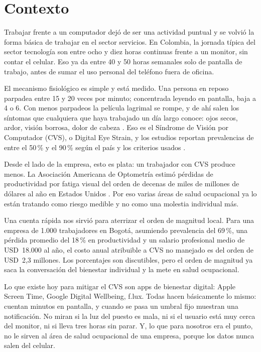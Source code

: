 \documentclass[conference]{IEEEtran}
\begin{document}
\section{Contexto}

Trabajar frente a un computador dejó de ser una actividad puntual y se
volvió la forma básica de trabajar en el sector servicios. En Colombia, 
la jornada típica del sector tecnología son entre ocho y diez horas 
continuas frente a un monitor, sin contar el celular. Eso ya da entre 40 
y 50 horas semanales solo de pantalla de trabajo, antes de sumar el uso 
personal del teléfono fuera de oficina.

El mecanismo fisiológico es simple y está medido. Una persona en reposo 
parpadea entre 15 y 20 veces por minuto; concentrada leyendo en pantalla, 
baja a 4 o 6. Con menos parpadeos la película lagrimal se rompe, y de ahí 
salen los síntomas que cualquiera que haya trabajado un día largo conoce: 
ojos secos, ardor, visión borrosa, dolor de cabeza \cite{sheppard2018}. 
Eso es el Síndrome de Visión por Computador (CVS), o Digital Eye Strain, 
y los estudios reportan prevalencias de entre el 50\,\% y el 90\,\% según 
el país y los criterios usados \cite{sheppard2018}.

Desde el lado de la empresa, esto es plata: un trabajador con CVS produce 
menos. La Asociación Americana de Optometría estimó pérdidas de
productividad por fatiga visual del orden de decenas de miles de millones 
de dólares al año en Estados Unidos \cite{aoa2023}. Por eso varias áreas 
de salud ocupacional ya lo están tratando como riesgo medible y no como 
una molestia individual más.

Una cuenta rápida nos sirvió para aterrizar el orden de magnitud local. 
Para una empresa de 1.000 trabajadores en Bogotá, asumiendo prevalencia 
del 69\,\%, una pérdida promedio del 18\,\% en productividad y un salario 
profesional medio de USD~18.000 al año, el costo anual atribuible a CVS 
no manejado es del orden de USD~2,3 millones. Los porcentajes son 
discutibles, pero el orden de magnitud ya saca la conversación del 
bienestar individual y la mete en salud ocupacional.

Lo que existe hoy para mitigar el CVS son apps de bienestar digital: Apple 
Screen Time, Google Digital Wellbeing, f.lux. Todas hacen básicamente lo 
mismo: cuentan minutos en pantalla, y cuando se pasa un umbral fijo 
muestran una notificación. No miran si la luz del puesto es mala, ni si 
el usuario está muy cerca del monitor, ni si lleva tres horas sin parar. 
Y, lo que para nosotros era el punto, no le sirven al área de salud 
ocupacional de una empresa, porque los datos nunca salen del celular.
\end{document}
